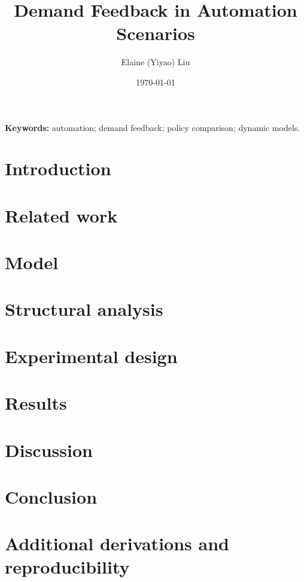 \documentclass[11pt,letterpaper]{article}
\title{Demand Feedback in Automation Scenarios}
\author{Elaine (Yiyao) Liu}
\date{\today}
\renewenvironment{abstract}{%
  \par\small\begin{center}\bfseries\abstractname\end{center}%
  \begin{list}{}{\setlength{\leftmargin}{0.25in}%
    \setlength{\rightmargin}{0.25in}\setlength{\listparindent}{0pt}%
    \setlength{\itemindent}{0pt}\setlength{\parsep}{0pt}%
    \setlength{\topsep}{0pt}}%
  \item\relax\ignorespaces
}{\par\end{list}\normalsize\vspace{0.5\baselineskip}}
\begin{document}
\maketitle
\begin{abstract}
\end{abstract}
\noindent\textbf{Keywords:} automation; demand feedback; policy comparison; dynamic models.
\section{Introduction}
\section{Related work}
\section{Model}
\section{Structural analysis}
\section{Experimental design}
\section{Results}
\section{Discussion}
\section{Conclusion}
% 
% 
\appendix
\section{Additional derivations and reproducibility}
\end{document}
